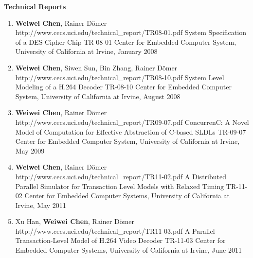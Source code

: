 \vspace{5mm}
{\textbf{\large Technical Reports}}
\vspace{-2mm}
\begin{enumerate}
\item
	\mypubhl
	{\textbf{Weiwei Chen}, Rainer D\"{o}mer}
	{http://www.cecs.uci.edu/technical_report/TR08-01.pdf}
	{System Specification of a DES Cipher Chip}
	{}
	{TR-08-01}
	{Center for Embedded Computer System, University of California at Irvine, January 2008}
	
	
\item
	\mypubhl
	{\textbf{Weiwei Chen}, Siwen Sun, Bin Zhang, Rainer D\"{o}mer}
	{http://www.cecs.uci.edu/technical_report/TR08-10.pdf}
	{System Level Modeling of a H.264 Decoder}
	{}
	{TR-08-10}
	{Center for Embedded Computer System, University of California at Irvine, August 2008}
	
\item
	\mypubhl
	{\textbf{Weiwei Chen}, Rainer D\"{o}mer}
	{http://www.cecs.uci.edu/technical_report/TR09-07.pdf}
	{ConcurrenC: A Novel Model of Computation for Effective Abstraction of C-based SLDLs}
	{}
	{TR-09-07}
	{Center for Embedded Computer System, University of California at Irvine, May 2009}
	
	
\item
	\mypubhl
	{\textbf{Weiwei Chen}, Rainer D\"{o}mer}
	{http://www.cecs.uci.edu/technical_report/TR11-02.pdf}
	{A Distributed Parallel Simulator for Transaction Level Models with Relaxed Timing}
	{}
	{TR-11-02}
	{Center for Embedded Computer Systems, University of California at Irvine, May 2011}
	
\item
	\mypubhl
	{Xu Han, \textbf{Weiwei Chen}, Rainer D\"{o}mer}
	{http://www.cecs.uci.edu/technical_report/TR11-03.pdf}
	{A Parallel Transaction-Level Model of H.264 Video Decoder}
	{}
	{TR-11-03} 
	{Center for Embedded Computer Systems, University of California at Irvine, June 2011}
\end{enumerate}

